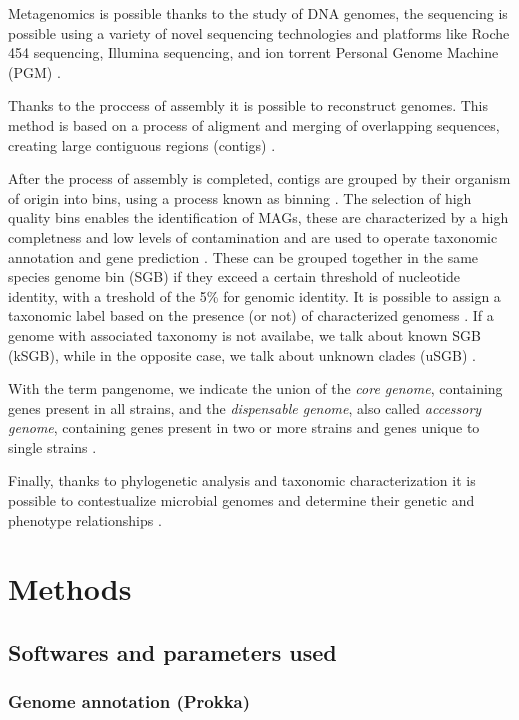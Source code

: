 \documentclass[a4paper,titlepage, oneside]{book}
\begin{document}
Metagenomics is possible thanks to the study of DNA genomes, the sequencing is possible using a variety of novel sequencing technologies and platforms like Roche 454 sequencing, Illumina sequencing, and ion torrent Personal Genome Machine (PGM) \cite{Sequencing}.

Thanks to the proccess of assembly it is possible to reconstruct genomes. This method is based on a process of aligment and merging of overlapping sequences, creating large contiguous regions (contigs) \cite{Assembly}.

After the process of assembly is completed, contigs are grouped by their organism of origin into bins, using a process known as binning \cite{Binning}. The selection of high quality bins enables the identification of MAGs, these are characterized by a high completness and low levels of contamination and are used to operate taxonomic annotation and gene prediction \cite{MAG2}. These can be grouped together in the same species genome bin (SGB) if they exceed a certain threshold of nucleotide identity, with a treshold of the 5\% for genomic identity. It is possible to assign a taxonomic label based on the presence (or not) of characterized genomess \cite{SGB2}. If a genome with associated taxonomy is not availabe, we talk about known SGB (kSGB), while in the opposite case, we talk about unknown clades (uSGB) \cite{SGB}.



With the term pangenome, we indicate the union of the \textit{core genome}, containing genes present in all strains, and the \textit{dispensable genome}, also called \textit{accessory genome}, containing genes present in two or more strains and genes unique to single strains \cite{Medini}.

Finally, thanks to phylogenetic analysis and taxonomic characterization it is possible to contestualize microbial genomes and determine their genetic and phenotype relationships \cite{Phylo}.




\chapter{Methods}
\section{Softwares and parameters used}
\subsection{Genome annotation (Prokka)}
\end{document}
